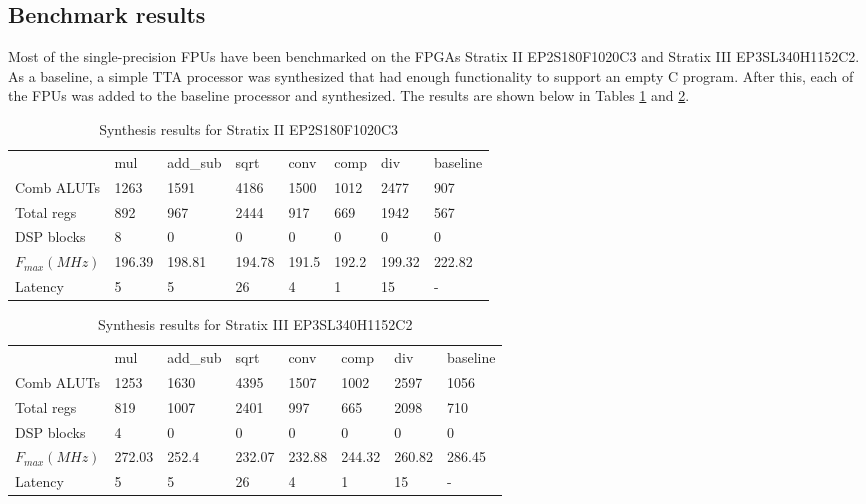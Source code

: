 \documentclass[twoside]{tceusermanual}
\begin{document}
\subsection{Benchmark results}

Most of the single-precision FPUs have been benchmarked on the FPGAs Stratix II EP2S180F1020C3 and 
Stratix III EP3SL340H1152C2. As a baseline, a simple TTA processor 
was synthesized that had enough functionality to support an empty C program. 
After this, each of the FPUs was added to the baseline processor and synthesized. 
The results are shown below in Tables \ref{table:fpu_benchmark1}
and \ref{table:fpu_benchmark2}.

\begin{table}
\begin{center}
\begin{tabular}{|l|l|l|l|l|l|l|l|}\cline{1-8}
 & mul & add\_sub & sqrt & conv & comp & div & baseline \\\cline{1-8}
Comb ALUTs & 1263 & 1591 & 4186 & 1500 & 1012 & 2477 & 907 \\\cline{1-8}
Total regs & 892 & 967 & 2444 & 917 & 669 & 1942 & 567 \\\cline{1-8}
DSP blocks & 8 & 0 & 0 & 0 & 0 & 0 & 0 \\\cline{1-8}
$F_{max} (MHz)$ & 196.39 & 198.81 & 194.78 & 191.5 & 192.2 & 199.32 & 222.82 \\\cline{1-8}
Latency & 5 & 5 & 26 & 4 & 1 & 15 & - \\\cline{1-8}
\end{tabular}
\end{center}
\caption{Synthesis results for Stratix II EP2S180F1020C3}
\label{table:fpu_benchmark1}
\end{table}

\begin{table}
\begin{center}
\begin{tabular}{|l|l|l|l|l|l|l|l|}\cline{1-8}
 & mul & add\_sub & sqrt & conv & comp & div & baseline \\\cline{1-8}
Comb ALUTs & 1253 & 1630 & 4395 & 1507 & 1002 & 2597 & 1056 \\\cline{1-8}
Total regs & 819 & 1007 & 2401 & 997 & 665 & 2098 & 710 \\\cline{1-8}
DSP blocks & 4 & 0 & 0 & 0 & 0 & 0 & 0 \\\cline{1-8}
$F_{max} (MHz)$ & 272.03 & 252.4 & 232.07 & 232.88 & 244.32 & 260.82 & 286.45 \\\cline{1-8}
Latency & 5 & 5 & 26 & 4 & 1 & 15 & - \\\cline{1-8}
\end{tabular}
\end{center}
\caption{Synthesis results for Stratix III EP3SL340H1152C2}
\label{table:fpu_benchmark2}
\end{table}
\end{document}
